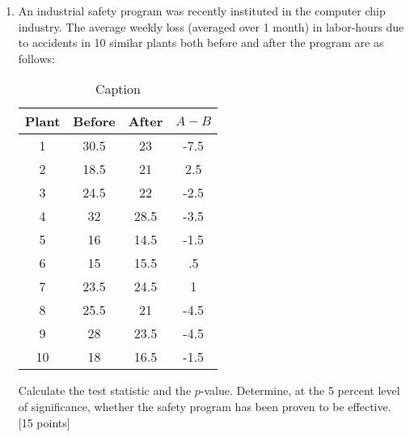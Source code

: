 \documentclass[11pt]{article}
\begin{document}
\begin{enumerate}
\item An industrial safety program was recently instituted in the computer chip industry. The average weekly loss (averaged over 1 month) in labor-hours due to accidents in 10 similar plants both before and after the program are as follows:
\begin{table}[]
    \centering
    \begin{tabular}{|c|c|c|c|}
    \hline
Plant & Before & After & $A-B$ \\
\hline
1 & 30.5 & 23 & -7.5 \\
2 & 18.5 & 21 & 2.5 \\
3 & 24.5 & 22 & -2.5 \\
4 &32 &28.5 & -3.5 \\
5 &16 &14.5 & -1.5 \\
6 &15 &15.5 &.5 \\
7 &23.5 &24.5 &1 \\
8 &25.5 &21 & -4.5 \\
9 &28 &23.5 & -4.5 \\
10 & 18 &16.5 & -1.5\\\hline
    \end{tabular}
    \caption{Caption}
    \label{tab:placeholder}
\end{table}
Calculate the test statistic and the $p$-value. Determine, at the 5 percent level of significance, whether the safety program has been proven to be effective. \textsf{[15 points]}


\end{enumerate}
\end{document}

